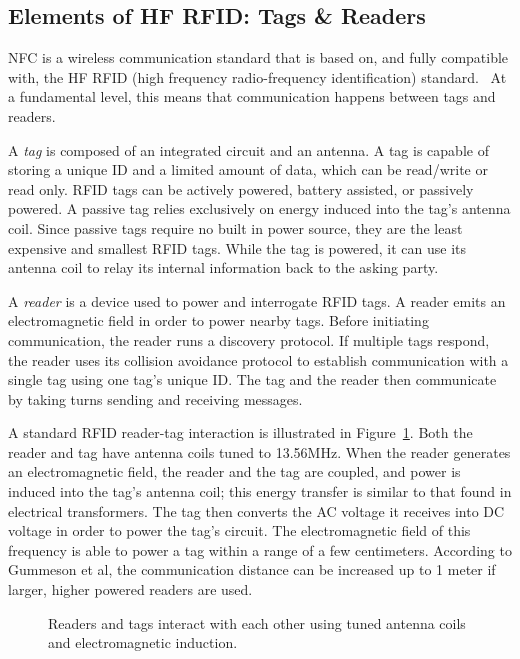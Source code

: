 \documentclass{sig-alternate}
\begin{document}
\subsection{Elements of HF RFID: Tags \& Readers}
\label{sec:activePassive}

NFC is a wireless communication standard that is based on, and fully compatible with, the HF RFID (high frequency radio-frequency identification) standard.~\cite{Gum2013} At a fundamental level, this means that communication happens between tags and readers. 

A \textit{tag} is composed of an integrated circuit and an antenna. A tag is capable of storing a unique ID and a limited amount of data, which can be read/write or read only. RFID tags can be actively powered, battery assisted, or passively powered. A passive tag relies exclusively on energy induced into the tag's antenna coil. Since passive tags require no built in power source, they are the least expensive and smallest RFID tags. While the tag is powered, it can use its antenna coil to relay its internal information back to the asking party.~\cite{wiki:RFID}

A \textit{reader} is a device used to power and interrogate RFID tags. A reader emits an electromagnetic field in order to power nearby tags. Before initiating communication, the reader runs a discovery protocol. If multiple tags respond, the reader uses its collision avoidance protocol to establish communication with a single tag using one tag's unique ID. The tag and the reader then communicate by taking turns sending and receiving messages.~\cite{Gum2013}

A standard RFID reader-tag interaction is illustrated in Figure~\ref{fig:rfid}. Both the reader and tag have antenna coils tuned to 13.56MHz. When the reader generates an electromagnetic field, the reader and the tag are coupled, and power is induced into the tag's antenna coil; this energy transfer is similar to that found in electrical transformers. The tag then converts the AC voltage it receives into DC voltage in order to power the tag's circuit. The electromagnetic field of this frequency is able to power a tag within a range of a few centimeters. According to Gummeson et al, the communication distance can be increased up to 1 meter if larger, higher powered readers are used.~\cite{Gum2013}


\begin{figure}
\centering
{}
\caption{Readers and tags interact with each other using tuned antenna coils and electromagnetic induction. 
\cite{emmiterAndTag}}
\label{fig:rfid}
\end{figure}
\end{document}
